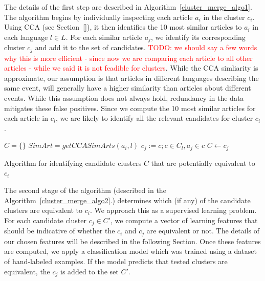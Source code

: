 \documentclass[twoside,11pt]{article}
\newcommand{\todo}[1]{\textcolor{red}{TODO: #1}}
\begin{document}
The details of the first step are described in Algorithm~\ref{cluster_merge_algo1}. The algorithm begins by individually inspecting each article $a_i$ in the cluster $c_i$. Using CCA  (see Section~\ref{}),  it then identifies the 10 most similar articles to $a_i$ in each language $l \in L$. For each  similar article $a_j$, we identify its corresponding  cluster $c_j$ and add it to the set of candidates. \todo{we should say a few words why this is more efficient - since now we are comparing each article to all other articles - while we said it is not feadible for clusters}. While the CCA simliarity is approximate, our  assumption  is that articles in different languages describing the same event, will generally have a higher similarity than articles about different events. While this assumption does not always hold, redundancy in the data mitigates these false positives. Since we compute the 10 most similar articles for each article in $c_i$, we are likely to identify all the relevant candidates for cluster $c_i$.

\begin{algorithm}[t!]
$C = \{\}$\;
 {
     {
        $SimArt = getCCASimArts(a_i, l)$\;
         {
            $c_j := c ; c \in C_l, a_j \in c$\;
            $C \leftarrow c_j$\;
        }
    }
}
\caption{Algorithm for identifying candidate clusters $C$ that are potentially equivalent to $c_i$}
\label{cluster_merge_algo1}
\end{algorithm}

The second stage of the algorithm (described in the Algorithm~\ref{cluster_merge_algo2}.) determines which (if any) of the candidate clusters are equivalent to $c_i$. We approach this as a supervised learning problem. For each candidate cluster $c_j \in C'$, we compute a vector of learning features that should be indicative of whether the $c_i$ and $c_j$ are equivalent or not. The details of our chosen features will be described in the following Section. Once these features are computed, we apply a classification model which was trained using a  dataset  of hand-labeled examples. If the model predicts that tested clusters are equivalent, the $c_j$ is added to the set $C'$.
\end{document}
